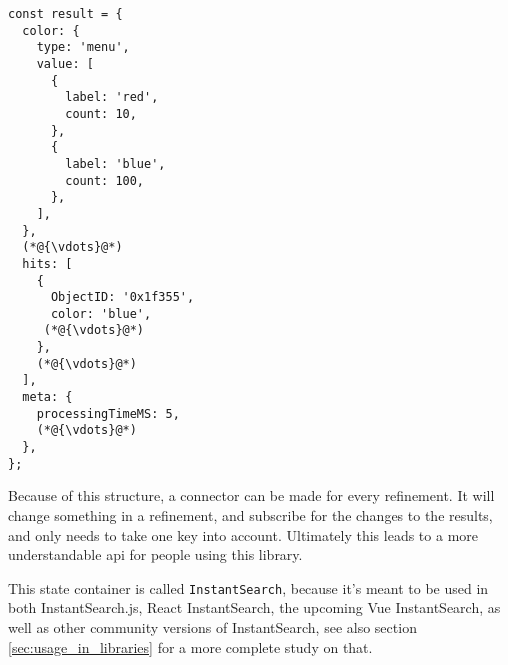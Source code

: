 \begin{minipage}{\linewidth}
\begin{lstlisting}[caption={Results container in the InstantSearch Core state},label={lst:is-core-state-4}]
const result = {
  color: {
    type: 'menu',
    value: [
      {
        label: 'red',
        count: 10,
      },
      {
        label: 'blue',
        count: 100,
      },
    ],
  },
  (*@{\vdots}@*)
  hits: [
    {
      ObjectID: '0x1f355',
      color: 'blue',
     (*@{\vdots}@*)
    },
    (*@{\vdots}@*)
  ],
  meta: { 
    processingTimeMS: 5,
    (*@{\vdots}@*)
  },
};
\end{lstlisting}
\end{minipage}

Because of this structure, a connector can be made for every refinement. It will change something in a refinement, and subscribe for the changes to the results, and only needs to take one key into account. Ultimately this leads to a more understandable \acrshort{api} for people using this \gls{library}.

This state container is called {\tt InstantSearch}, because it's meant to be used in both InstantSearch.js, React InstantSearch, the upcoming Vue InstantSearch, as well as other community versions of InstantSearch, see also section \ref{sec:usage_in_libraries} for a more complete study on that.

